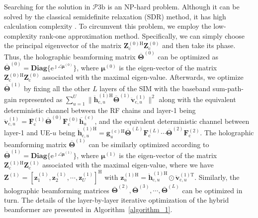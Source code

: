 \documentclass[lettersize,journal]{IEEEtran}
\theoremstyle{remark}
\begin{document}
Searching for the solution in $\mathcal{P}\mathrm{3b}$ is an NP-hard problem. Although it can be solved by the classical semidefinite relaxation (SDR) method, it has high calculation complexity \cite{chi2017convex}. To circumvent this problem, we employ the low-complexity rank-one approximation method. Specifically, we can simply choose the principal eigenvector of the matrix $\mathbf{Z}_{\mathrm{c}}^{(0)\mathrm{H}}\mathbf{Z}_{\mathrm{c}}^{(0)}$ and then take its phase. Thus, the holographic beamforming matrix $\overline{\mathbf{\Theta}}^{(0)}$ can be optimized as $\overline{\mathbf{\Theta}}^{(0)}=\mathbf{Diag}\{{\mathrm{e}^{\jmath\angle\boldsymbol{\mu}^{(0)}}}\}$, where $\boldsymbol{\mu}^{(0)}$ is the eigen-vector of the matrix $\mathbf{Z}_{\mathrm{c}}^{(0)\mathrm{H}}\mathbf{Z}_{\mathrm{c}}^{(0)}$ associated with the maximal eigen-value. Afterwards, we optimize $\overline{\mathbf{\Theta}}^{(1)}$ by fixing all the other $L$ layers of the SIM with the baseband sum-path-gain represented as $\sum_{u=1}^{U}\|\ddot{\mathbf{h}}_{\mathrm{c},u}^{(1)\mathrm{H}}
\overline{\mathbf{\Theta}}^{(1)}\ddot{\mathbf{v}}_{\mathrm{c},u}^{(1)}\|^2$ along with the equivalent deterministic channel between the RF chains and layer-1 being $\ddot{\mathbf{v}}_{\mathrm{c},u}^{(1)}=\mathbf{F}_\mathrm{c}^{(1)}
\overline{\mathbf{\Theta}}^{(0)}\mathbf{F}_\mathrm{c}^{(0)}\overline{\mathbf{h}}_u^{(\mathrm{c})}$,
and the equivalent deterministic channel between layer-1 and UE-$u$ being $\ddot{\mathbf{h}}_{\mathrm{c},u}^{(1)\mathrm{H}}
=\mathbf{g}_u^{(\mathrm{c}){\mathrm{H}}}\overline{\mathbf{\Theta}}^{(L)}
\mathbf{F}_\mathrm{c}^{(L)}\cdots\overline{\mathbf{\Theta}}^{(2)}\mathbf{F}_\mathrm{c}^{(2)}$. The holographic beamforming matrix $\overline{\mathbf{\Theta}}^{(1)}$ can be similarly optimized according to $\overline{\mathbf{\Theta}}^{(1)}=
\mathbf{Diag}\{{\mathrm{e}^{\jmath\angle\boldsymbol{\mu}^{(1)}}}\}$, where $\boldsymbol{\mu}^{(1)}$ is the eigen-vector of the matrix $\mathbf{Z}_{\mathrm{c}}^{(1)\mathrm{H}}\mathbf{Z}_{\mathrm{c}}^{(1)}$ associated with the maximal eigen-value, where we have $\mathbf{Z}^{(1)}=[\mathbf{z}_1^{(1)},\mathbf{z}_2^{(1)},\cdots,
\mathbf{z}_U^{(1)}]^{\mathrm{H}}$ with $\mathbf{z}_u^{(1)\mathrm{H}}=
\ddot{\mathbf{h}}_{\mathrm{c},u}^{(1)\mathrm{H}}\odot
\ddot{\mathbf{v}}_{\mathrm{c},u}^{(1)\mathrm{T}}$. Similarly, the holographic beamforming matrices $\overline{\mathbf{\Theta}}^{(2)},\overline{\mathbf{\Theta}}^{(3)},\cdots,
\overline{\mathbf{\Theta}}^{(L)}$ can be optimized in turn. The details of the layer-by-layer iterative optimization of the hybrid beamformer are presented in Algorithm~\ref{algorithm_1}.
\end{document}
